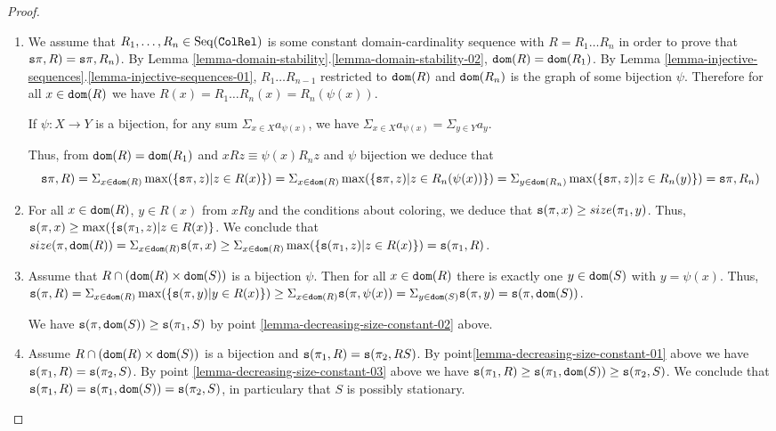 \documentclass{lmcs}
\begin{document}
\begin{proof}

\begin{enumerate}
\item
We assume that $R_1, \ldots, R_n \in {\rm Seq}({\tt ColRel})$ is some constant domain-cardinality  
sequence  with $R = R_1 \ldots R_n$ in order to prove that
${\tt s}\pi,R) = {\tt s}\pi,R_{n})$.
By Lemma \ref{lemma-domain-stability}.\ref{lemma-domain-stability-02}, 
${\tt dom}(R) = {\tt dom}(R_1)$.
By Lemma \ref{lemma-injective-sequences}.\ref{lemma-injective-sequences-01},
$R_1 \ldots R_{n-1}$ restricted to ${\tt dom}(R)$ and  ${\tt dom}(R_{n})$ 
is the graph of some bijection $\psi$. Therefore for
all $x \in {\tt dom}(R)$ we have $R(x) = R_1 \ldots R_n(x) = R_{n}(\psi(x))$.

If $\psi:X \rightarrow Y$ is a bijection, for any sum $\Sigma_{x \in X} a_{\psi(x)}$, 
we have $\Sigma_{x \in X} a_{\psi(x)} = \Sigma_{y \in Y} a_y$. 

Thus, from ${\tt dom}(R) = {\tt dom}(R_1)$ and $x R z \equiv \psi(x) R_{n} z$ and $\psi$ bijection 
we deduce that 
$$
{\tt s}\pi,R) =
\Sigma_{x \in {\tt dom}(R)}             \max(\{{\tt s}\pi,z) | z \in R(x) \})                      = 
\Sigma_{x \in {\tt dom}(R)}             \max(\{{\tt s}\pi,z) | z \in R_{n}(\psi(x))  \})     =
\Sigma_{y \in {\tt dom}(R_{n})}     \max(\{{\tt s}\pi,z) | z \in R_{n}(y)           \})     =
{\tt s}\pi,R_{n})
$$

\item
For all $x \in {\tt dom}(R)$, $y \in R(x)$ from $x R y$ and the conditions 
about coloring, we deduce that ${\tt s}(\pi,x) \ge size(\pi_1,y)$. 
Thus, ${\tt s}(\pi,x) \ge \max(\{{\tt s}(\pi_1,z) | z \in R(x) \}$.
We conclude that $size(\pi,{\tt dom}(R)) = \Sigma_{x \in {\tt dom}(R)} {\tt s}(\pi,x) \ge 
\Sigma_{x \in {\tt dom}(R)} \max(\{{\tt s}(\pi_1,z) | z \in R(x) \}) = {\tt s}(\pi_1,R)$.

\item
Assume that $R \cap ({\tt dom}(R) \times {\tt dom}(S))$ is a bijection $\psi$.
Then for all $x \in {\tt dom}(R)$ there is exactly  one $y \in {\tt dom}(S)$ with $y = \psi(x)$.
Thus, 
$ 
{\tt s}(\pi,R) = 
\Sigma_{x \in {\tt dom}(R)} \max(\{{\tt s}(\pi,y) | y \in R(x) \}) \ge 
\Sigma_{x \in {\tt dom}(R)} {\tt s}(\pi,\psi(x)) =  
\Sigma_{y \in {\tt dom}(S)} {\tt s}(\pi,y) = 
{\tt s}(\pi,{\tt dom}(S))
$.

We have ${\tt s}(\pi,{\tt dom}(S)) \ge {\tt s}(\pi_1,S)$ by point \ref{lemma-decreasing-size-constant-02} above.

\item
Assume $R \cap ({\tt dom}(R) \times {\tt dom}(S))$ is a bijection and 
${\tt s}(\pi_1,R) = {\tt s}(\pi_2,RS)$.
By point\ref{lemma-decreasing-size-constant-01} above we have ${\tt s}(\pi_1,R) = {\tt s}(\pi_2,S)$.
By point \ref{lemma-decreasing-size-constant-03} above we have
${\tt s}(\pi_1, R) \ge {\tt s}(\pi_1,{\tt dom}(S)) \ge {\tt s}(\pi_2,S)$.
We conclude that
${\tt s}(\pi_1, R) = {\tt s}(\pi_1,{\tt dom}(S)) = {\tt s}(\pi_2,S)$, in particulary that $S$ is possibly
stationary.
 



\end{enumerate}
\end{proof}
\end{document}
